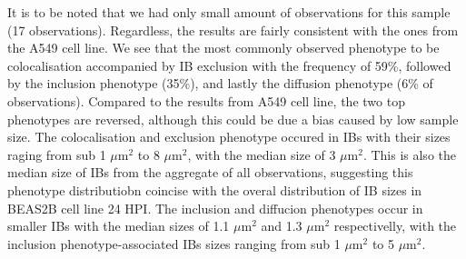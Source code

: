 It is to be noted that we had only small amount of observations for this sample (17 observations). Regardless, the results are fairly consistent with the ones from the A549 cell line. We see that the most commonly observed phenotype to be colocalisation accompanied by IB exclusion with the frequency of 59\%, followed by the inclusion phenotype (35\%), and lastly the diffusion phenotype (6\% of observations). Compared to the results from A549 cell line, the two top phenotypes are reversed, although this could be due a bias caused by low sample size. The colocalisation and exclusion phenotype occured in IBs with their sizes raging from sub 1 \(\mu \mbox{m}^2\) to 8 \(\mu \mbox{m}^2\), with the median size of 3 \(\mu \mbox{m}^2\). This is also the median size of IBs from the aggregate of all observations, suggesting this phenotype distributiobn coincise with the overal distribution of IB sizes in BEAS2B cell line 24 HPI. The inclusion and diffucion phenotypes occur in smaller IBs with the median sizes of 1.1 \(\mu \mbox{m}^2\) and 1.3 \(\mu \mbox{m}^2\) respectivelly, with the inclusion phenotype-associated IBs sizes ranging from sub 1 \(\mu \mbox{m}^2\) to 5 \(\mu \mbox{m}^2\).

